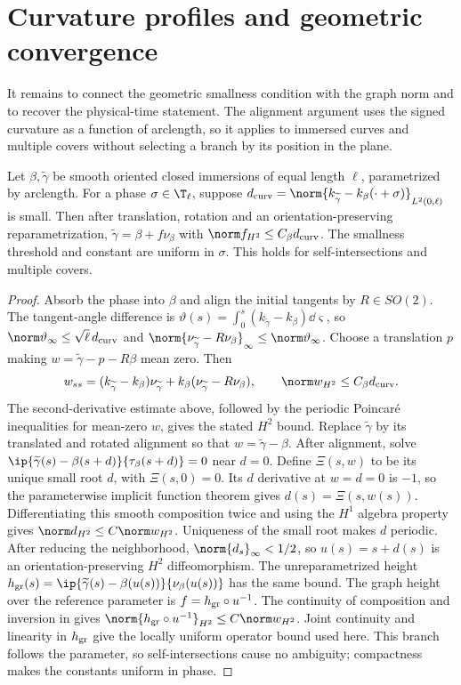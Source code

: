 \section{Curvature profiles and geometric convergence}\label{sec:geometric}
It remains to connect the geometric smallness condition with the graph norm and to recover the physical-time statement. The alignment argument uses the signed curvature as a function of arclength, so it applies to immersed curves and multiple covers without selecting a branch by its position in the plane.
\begin{lemma}\label{lem:curvature-entry}
Let $\beta,\widetilde\gamma$ be smooth oriented closed immersions of equal length $\ell$, parametrized by arclength. For a phase $\sigma\in\T_\ell$, suppose $d_{\rm curv}=\norm{k_{\widetilde\gamma}-k_\beta(\cdot+\sigma)}_{L^2(0,\ell)}$ is small. Then after translation, rotation and an orientation-preserving reparametrization, $\widetilde\gamma=\beta+f\nu_\beta$ with $\norm f_{H^2}\le C_\beta d_{\rm curv}$. The smallness threshold and constant are uniform in $\sigma$. This holds for self-intersections and multiple covers.
\end{lemma}
\begin{proof}
Absorb the phase into $\beta$ and align the initial tangents by $R\in SO(2)$. The tangent-angle difference is $\vartheta(s)=\int_0^s(k_{\widetilde\gamma}-k_\beta)\dd\varsigma$, so $\norm\vartheta_\infty\le\sqrt\ell\,d_{\rm curv}$ and $\norm{\nu_{\widetilde\gamma}-R\nu_\beta}_\infty\le\norm\vartheta_\infty$. Choose a translation $p$ making $w=\widetilde\gamma-p-R\beta$ mean zero. Then
\[
 w_{ss}=(k_{\widetilde\gamma}-k_\beta)\nu_{\widetilde\gamma}+k_\beta(\nu_{\widetilde\gamma}-R\nu_\beta),
 \qquad \norm w_{H^2}\le C_\beta d_{\rm curv}.
\]
The second-derivative estimate above, followed by the periodic Poincar\'e inequalities for mean-zero $w$, gives the stated $H^2$ bound. Replace $\widetilde\gamma$ by its translated and rotated alignment so that $w=\widetilde\gamma-\beta$. After alignment, solve $\ip{\widetilde\gamma(s)-\beta(s+d)}{\tau_\beta(s+d)}=0$ near $d=0$. Define $\Xi(s,w)$ to be its unique small root $d$, with $\Xi(s,0)=0$. Its $d$ derivative at $w=d=0$ is $-1$, so the parameterwise implicit function theorem gives $d(s)=\Xi(s,w(s))$. Differentiating this smooth composition twice and using the $H^1$ algebra property gives $\norm d_{H^2}\le C\norm w_{H^2}$. Uniqueness of the small root makes $d$ periodic. After reducing the neighborhood, $\norm{d_s}_\infty<1/2$, so $u(s)=s+d(s)$ is an orientation-preserving $H^2$ diffeomorphism. The unreparametrized height $h_{\rm gr}(s)=\ip{\widetilde\gamma(s)-\beta(u(s))}{\nu_\beta(u(s))}$ has the same bound. The graph height over the reference parameter is $f=h_{\rm gr}\circ u^{-1}$. The continuity of composition and inversion in \cite[Theorem~1.2, $s=2,r=0$]{IKT} gives $\norm{h_{\rm gr}\circ u^{-1}}_{H^2}\le C\norm w_{H^2}$. Joint continuity and linearity in $h_{\rm gr}$ give the locally uniform operator bound used here. This branch follows the parameter, so self-intersections cause no ambiguity; compactness makes the constants uniform in phase.
\end{proof}

